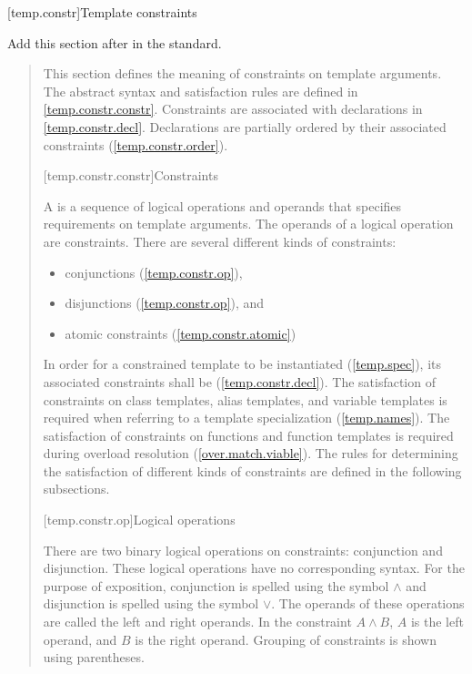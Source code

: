 
\setcounter{section}{9}
[temp.constr]{Template constraints}

Add this section after  in the \Cpp standard.

\begin{quote}
\begin{addedblock}

\pnum
\enternote
This section defines the meaning of constraints on template arguments.
% 
The abstract syntax and satisfaction rules are defined
in \ref{temp.constr.constr}. 
% 
Constraints are associated with declarations in \ref{temp.constr.decl}.
% 
Declarations are partially ordered by their associated constraints 
(\ref{temp.constr.order}).
\exitnote


[temp.constr.constr]{Constraints}

\pnum
A  is a sequence of logical operations and 
operands that specifies requirements on template arguments.
\enternote The operands of a logical operation are constraints. \exitnote
% 
There are several different kinds of constraints:
\begin{itemize}
\item conjunctions (\ref{temp.constr.op}),
\item disjunctions (\ref{temp.constr.op}), and
\item atomic constraints (\ref{temp.constr.atomic})
\end{itemize}

\pnum
In order for a constrained template to be instantiated (\ref{temp.spec}), its 
associated constraints shall be  (\ref{temp.constr.decl}).
% 
\enternote
The satisfaction of constraints on class templates, alias templates, 
and variable templates is required when referring to a template specialization 
(\ref{temp.names}). The satisfaction of constraints on functions and
function templates is required during overload resolution 
(\ref{over.match.viable}).
\exitnote
% 
The rules for determining the satisfaction of different kinds of 
constraints are defined in the following subsections.


[temp.constr.op]{Logical operations}

\pnum
There are two binary logical operations on constraints: conjunction
and disjunction.
% 
\enternote 
These logical operations have no corresponding \Cpp syntax.
For the purpose of exposition, conjunction is spelled
using the symbol $\land$ and disjunction is spelled using the 
symbol $\lor$. 
% 
The operands of these operations are called the left 
and right operands. In the constraint $A \land B$,
$A$ is the left operand, and $B$ is the right operand.
% 
Grouping of constraints is shown using parentheses.
\exitnote


\end{addedblock}
\end{quote}
